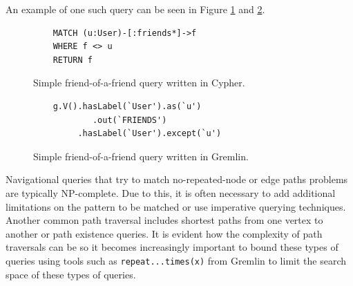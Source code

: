An example of one such query can be seen in Figure \ref{lst:cypher-nav-1} and \ref{lst:gremlin-nav-1}.

\begin{figure}[h]
    \centering
    \begin{verbatim}
    MATCH (u:User)-[:friends*]->f
    WHERE f <> u
    RETURN f
    \end{verbatim}
    \caption{Simple friend-of-a-friend query written in Cypher.}
    \label{lst:cypher-nav-1}
\end{figure}

\begin{figure}[h]
    \centering
    \begin{verbatim}
    g.V().hasLabel(`User').as(`u')
            .out(`FRIENDS')
         .hasLabel(`User').except(`u')
    \end{verbatim}
    \caption{Simple friend-of-a-friend query written in Gremlin.}
    \label{lst:gremlin-nav-1}
\end{figure}

Navigational queries that try to match no-repeated-node or edge paths problems are typically NP-complete. Due to this, it is often necessary to add additional limitations on the pattern to be matched or use imperative querying techniques. Another common path traversal includes shortest paths from one vertex to another or path existence queries. It is evident how the complexity of path traversals can be so it becomes increasingly important to bound these types of queries using tools such as \texttt{repeat...times(x)} from Gremlin to limit the search space of these types of queries.
